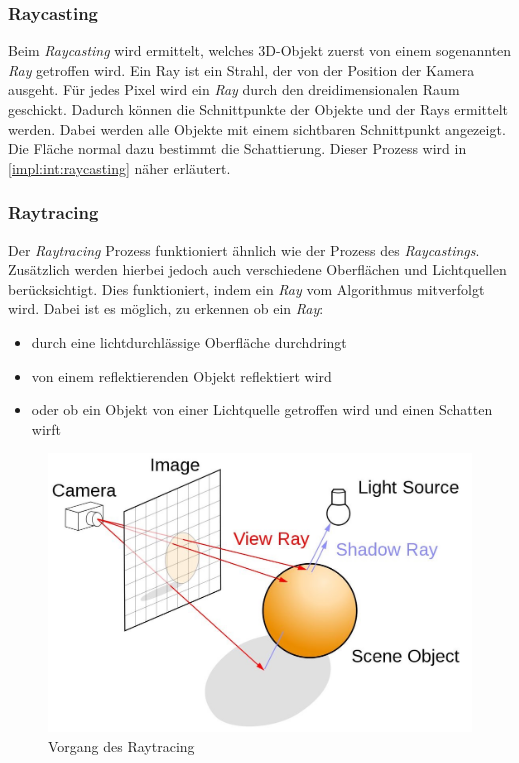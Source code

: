 \subsubsection{Raycasting}
\label{impl:rend:raycasting}
Beim \emph{Raycasting} wird ermittelt, welches 3D-Objekt zuerst von einem sogenannten \emph{Ray} getroffen wird. Ein Ray ist ein Strahl, der von der Position der Kamera ausgeht. Für jedes Pixel wird ein \emph{Ray} durch den dreidimensionalen Raum geschickt. Dadurch können die Schnittpunkte der Objekte und der Rays ermittelt werden. Dabei werden alle Objekte mit einem sichtbaren Schnittpunkt angezeigt. Die Fläche normal dazu bestimmt die Schattierung. Dieser Prozess wird in \ref{impl:int:raycasting} näher erläutert.
\cite{Rendering3DModels} 

\subsubsection{Raytracing}
Der \emph{Raytracing} Prozess funktioniert ähnlich wie der Prozess des \emph{Raycastings}. Zusätzlich werden hierbei jedoch auch verschiedene Oberflächen und Lichtquellen berücksichtigt. Dies funktioniert, indem ein \emph{Ray} vom Algorithmus mitverfolgt wird. Dabei ist es möglich, zu erkennen ob ein \emph{Ray}:
\begin{itemize}
    \item durch eine lichtdurchlässige Oberfläche durchdringt
    \item von einem reflektierenden Objekt reflektiert wird
    \item oder ob ein Objekt von einer Lichtquelle getroffen wird und einen Schatten wirft
\end{itemize}
\cite{RayTracingRasterization}

\begin{figure} [h]
    \centering
    \includegraphics[scale=0.3]{pics/ray-tracing.jpg}
    \caption{Vorgang des Raytracing \cite{RayTracingRasterization}}
    \label{fig:impl:ray-tracing}
\end{figure}


